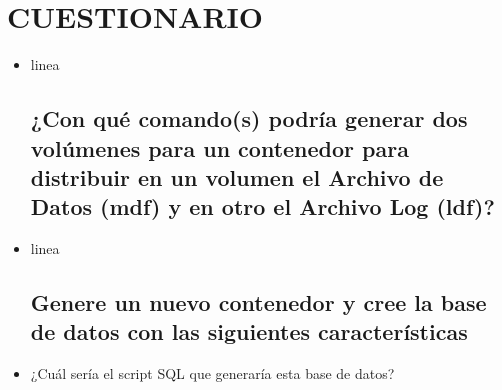 \section{CUESTIONARIO} 
\begin{itemize}
\subsection{¿Con qué comando(s) exportaría la imagen de Docker de Microsoft SQL Server a otra PC o servidor?}
	\item linea
\subsection{¿Con qué comando(s) podría generar dos volúmenes para un contenedor para distribuir en un volumen el Archivo
de Datos (mdf) y en otro el Archivo Log (ldf)?}
	\item linea

\subsection{Genere un nuevo contenedor y cree la base de datos con las siguientes características}
\item ¿Cuál sería el script SQL que generaría esta base de datos?

\end{itemize}